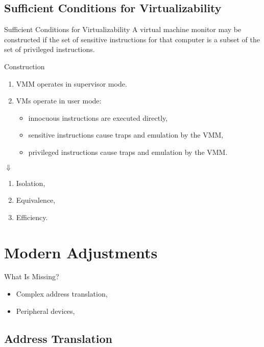\subsection{Sufficient Conditions for Virtualizability}

\begin{frame}{Sufficient Conditions for Virtualizability}
A virtual machine monitor may be constructed if the set of sensitive
instructions for that computer is a subset of the set of privileged
instructions.
\vfill\centering
{} 
\end{frame}

\begin{frame}{Construction}
\begin{enumerate}
\item VMM operates in supervisor mode.
\item VMs operate in user mode:
  \begin{itemize}
  \item innocuous instructions are executed directly,
  \item sensitive instructions cause traps and emulation by the VMM,
  \item privileged instructions cause traps and emulation by the VMM.
  \end{itemize}
\end{enumerate}
\pause
\centering$\Downarrow$
\begin{enumerate}
  \item Isolation,
  \item Equivalence,
  \item Efficiency.
\end{enumerate}
\end{frame}

\section{Modern Adjustments}

\begin{frame}{What Is Missing?}
\pause
\begin{itemize}
  \item Complex address translation,
  \item Peripheral devices,
\end{itemize}
\end{frame}

\subsection{Address Translation}

